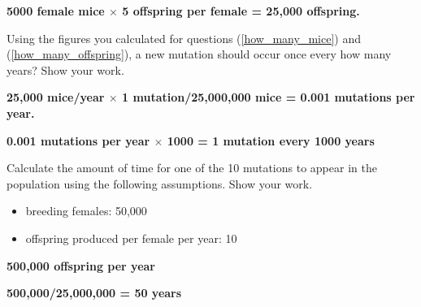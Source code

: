 \documentclass[11pt, hidelinks, addpoints]{exam}
\begin{document}
\begin{questions}
\ifprintanswers\vspace{\baselineskip}
	\textbf{5000 female mice $\times$ 5 offspring per female = 25,000 offspring.}
\else
\fi

\question[1]
\label{mutes_per_year}Using the figures you calculated for questions (\ref{how_many_mice}) and (\ref{how_many_offspring}),
a new mutation should occur once every how many years? Show your work.

\ifprintanswers\vspace{\baselineskip}
	\textbf{25,000 mice/year $\times$ 1 mutation/25,000,000 mice = 0.001 mutations per year.}
	
	\textbf{0.001 mutations per year $\times$ 1000 = 1 mutation every 1000 years}
\else
\fi


\question[1]
\label{ten_mutations}Calculate the amount of time for one of the 10 mutations to
appear in the population using the following assumptions. Show your work.

\begin{itemize}
\item
  breeding females: 50,000
\item
  offspring produced per female per year: 10
\end{itemize}

\ifprintanswers\vspace{\baselineskip}
	\textbf{500,000 offspring per year} 
	
	\textbf{500,000/25,000,000 = 50 years}
\else
\fi

\newpage


\end{questions}
\end{document}
